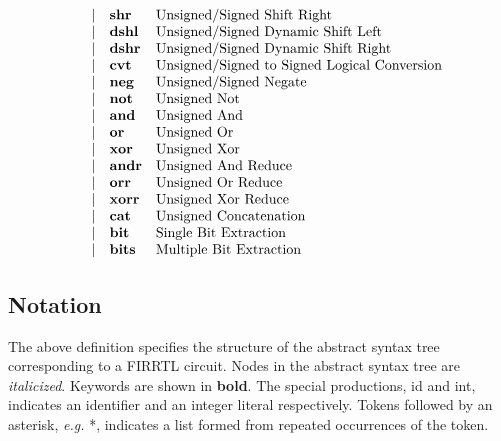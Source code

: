 \documentclass[12pt]{article}
\begin{document}
\[{\begin{array}{rrll}
              &\vert           &\text{\bf shr}            &\text{Unsigned/Signed Shift Right}\\
              &\vert           &\text{\bf dshl}           &\text{Unsigned/Signed Dynamic Shift Left}\\
              &\vert           &\text{\bf dshr}           &\text{Unsigned/Signed Dynamic Shift Right}\\
              &\vert           &\text{\bf cvt}            &\text{Unsigned/Signed to Signed Logical Conversion}\\
              &\vert           &\text{\bf neg}            &\text{Unsigned/Signed Negate}\\
              &\vert           &\text{\bf not}            &\text{Unsigned Not}\\
              &\vert           &\text{\bf and}            &\text{Unsigned And}\\
              &\vert           &\text{\bf or}             &\text{Unsigned Or}\\
              &\vert           &\text{\bf xor}            &\text{Unsigned Xor}\\
              &\vert           &\text{\bf andr}           &\text{Unsigned And Reduce}\\
              &\vert           &\text{\bf orr}            &\text{Unsigned Or Reduce}\\
              &\vert           &\text{\bf xorr}           &\text{Unsigned Xor Reduce}\\
              &\vert           &\text{\bf cat}            &\text{Unsigned Concatenation}\\
              &\vert           &\text{\bf bit}            &\text{Single Bit Extraction}\\
              &\vert           &\text{\bf bits}           &\text{Multiple Bit Extraction}\\
\end{array}
}
\]

\subsection{Notation}
The above definition specifies the structure of the abstract syntax tree corresponding to a FIRRTL circuit.
Nodes in the abstract syntax tree are {\em italicized}.
Keywords are shown in {\bf bold}.
The special productions, id and int, indicates an identifier and an integer literal respectively.
Tokens followed by an asterisk, {\em e.g.} *, indicates a list formed from repeated occurrences of the token.
\end{document}
